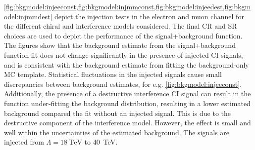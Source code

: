 \cref{fig:bkgmodel:injeeconst,fig:bkgmodel:injmmconst,fig:bkgmodel:injeedest,fig:bkgmodel:injmmdest} depict the injection tests in the electron and muon channel for the different chiral and interference models considered. The final CR and SR choices are used to depict the performance of the signal+background function. The figures show that the background estimate from the signal+background function fit does not change significantly in the presence of injected CI signals, and is consistent with the background estimate from fitting the background-only MC template. Statistical fluctuations in the injected signals cause small discrepancies between background estimates, for e.g. \cref{fig:bkgmodel:injeeconst}. Additionally, the presence of a destructive interference CI signal can result in the function under-fitting the background distribution, resulting in a lower estimated background compared the fit without an injected signal. This is due to the destructive component of the interference model. However, the effect is small and well within the uncertainties of the estimated background. The signals are injected from $\Lambda = \SI{18}{\tera\electronvolt}$ to \SI{40}{\tera\electronvolt}. 

